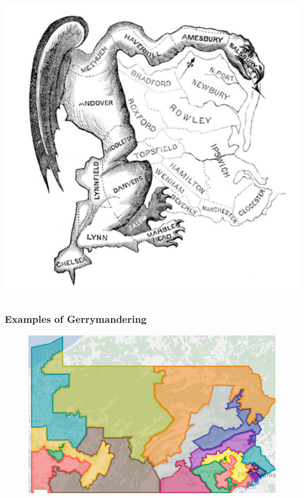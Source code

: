\documentclass[red]{beamer}
\begin{document}
\begin{frame} [t]
\begin{columns}
\begin{column}{0.45\textwidth}
    \includegraphics[scale = .40]{gerry_salamander.png}
    \label{fig:salamander}
    \end{column}
    \end{columns}
    \end{frame}

    \begin{frame} [t]
    \frametitle{Examples of Gerrymandering}
    \begin{figure}[h]
    \begin{center}
    \includegraphics[scale=0.7]{PA_big.png}
    \label{fig:PA_big}
    \end{center}
    \end{figure}  
    \end{frame}
    
\end{document}
